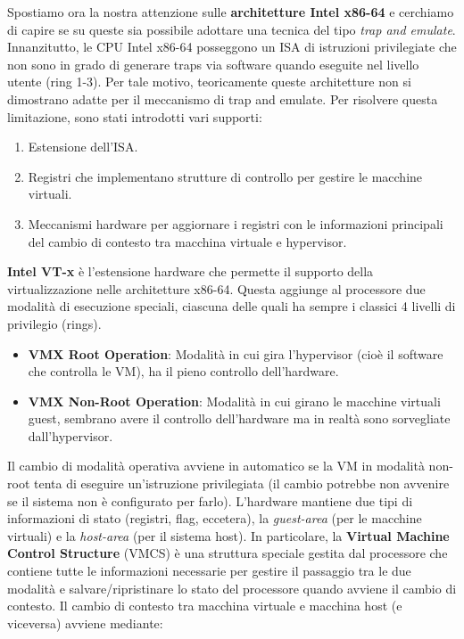 Spostiamo ora la nostra attenzione sulle \textbf{architetture Intel x86-64} e cerchiamo di capire se su queste sia possibile adottare una tecnica del tipo \textit{trap and emulate}. Innanzitutto, le CPU Intel x86-64 posseggono un ISA di istruzioni privilegiate che non sono in grado di generare traps via software quando eseguite nel livello utente (ring 1-3). Per tale motivo, teoricamente queste architetture non si dimostrano adatte per il meccanismo di trap and emulate. Per risolvere questa limitazione, sono stati introdotti vari supporti:
\begin{enumerate}
    \item Estensione dell'ISA.
    \item Registri che implementano strutture di controllo per gestire le macchine virtuali.
    \item Meccanismi hardware per aggiornare i registri con le informazioni principali del cambio di contesto tra macchina virtuale e hypervisor.
\end{enumerate}
\textbf{Intel VT-x} è l'estensione hardware che permette il supporto della virtualizzazione nelle architetture x86-64. Questa aggiunge al processore due modalità di esecuzione speciali, ciascuna delle quali ha sempre i classici 4 livelli di privilegio (rings).
\begin{itemize}
    \item \textbf{VMX Root Operation}: Modalità in cui gira l’hypervisor (cioè il software che controlla le VM), ha il pieno controllo dell’hardware.
    \item \textbf{VMX Non-Root Operation}: Modalità in cui girano le macchine virtuali guest, sembrano avere il controllo dell’hardware ma in realtà sono sorvegliate dall’hypervisor.
\end{itemize}
Il cambio di modalità operativa avviene in automatico se la VM in modalità non-root tenta di eseguire un'istruzione privilegiata (il cambio potrebbe non avvenire se il sistema non è configurato per farlo). L'hardware mantiene due tipi di informazioni di stato (registri, flag, eccetera), la \textit{guest-area} (per le macchine virtuali) e la \textit{host-area} (per il sistema host). In particolare, la \textbf{Virtual Machine Control Structure} (VMCS) è una struttura speciale gestita dal processore che contiene tutte le informazioni necessarie per gestire il passaggio tra le due modalità e salvare/ripristinare lo stato del processore quando avviene il cambio di contesto. Il cambio di contesto tra macchina virtuale e macchina host (e viceversa) avviene mediante:
